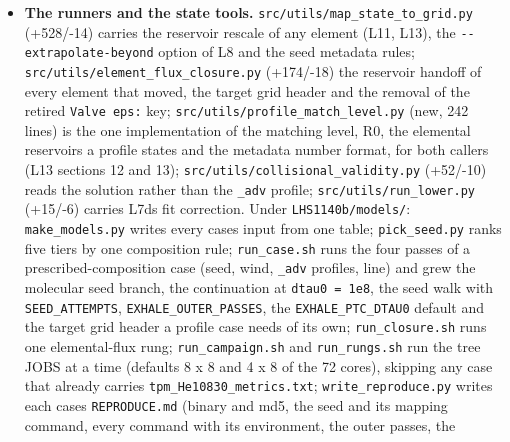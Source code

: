 \documentclass[english,a4paper]{my_memo}
\begin{document}
\begin{itemize}
  in its \texttt{REPRODUCE.md} can be tied to source text and not only to a hash; the
  earlier generation has its own,
  \texttt{BINARY\_MANIFEST\_db87b88d1ce5.txt}, written the same way. The campaign ran on
  both machines of the NFS mount and each \texttt{REPRODUCE.md} names its host: the 68
  prescribed atomic cases on lart4 at 6 jobs x 8 threads, the 9 elemental-flux
  closure rungs and the 6 XUV-scaled photochemical cases on lart3 at 4 x 8, the
  13 raised-pseudo-time re-solves on both, and the final pass on both at the
  same shapes. \texttt{models/archive\_results.sh\ \textless{}tag\textgreater{}} is what preserves a generation
  of results before the next one overwrites it.
\item
  \textbf{The runners and the state tools.} \texttt{src/utils/map\_state\_to\_grid.py}
  (+528/-14) carries the reservoir rescale of any element (L11, L13), the
  \texttt{-\/-extrapolate-beyond} option of L8 and the seed metadata rules;
  \texttt{src/utils/element\_flux\_closure.py} (+174/-18) the reservoir handoff of
  every element that moved, the target grid header and the removal of the
  retired \texttt{Valve\ eps:} key; \texttt{src/utils/profile\_match\_level.py} (new, 242
  lines) is the one implementation of the matching level, R0, the elemental
  reservoirs a profile states and the metadata number format, for both
  callers (L13 sections 12 and 13); \texttt{src/utils/collisional\_validity.py} (+52/-10) reads the
  solution rather than the \texttt{\_adv} profile; \texttt{src/utils/run\_lower.py} (+15/-6)
  carries L7d\textquotesingle s fit correction. Under \texttt{LHS1140b/models/}: \texttt{make\_models.py}
  writes every case\textquotesingle s input from one table; \texttt{pick\_seed.py} ranks five tiers by
  one composition rule; \texttt{run\_case.sh} runs the four passes of a
  prescribed-composition case (seed, wind, \texttt{\_adv} profiles, line) and grew
  the molecular seed branch, the continuation at \texttt{dtau0\ =\ 1e8}, the seed walk
  with \texttt{SEED\_ATTEMPTS}, \texttt{EXHALE\_OUTER\_PASSES}, the \texttt{EXHALE\_PTC\_DTAU0}
  default and the target grid header a profile case needs of its own;
  \texttt{run\_closure.sh} runs one
  elemental-flux rung; \texttt{run\_campaign.sh} and \texttt{run\_rungs.sh} run the tree
  JOBS at a time (defaults 8 x 8 and 4 x 8 of the 72 cores), skipping any
  case that already carries \texttt{tpm\_He10830\_metrics.txt}; \texttt{write\_reproduce.py}
  writes each case\textquotesingle s \texttt{REPRODUCE.md} (binary and md5, the seed and its mapping
  command, every command with its environment, the outer passes, the

\end{itemize}
\end{document}
